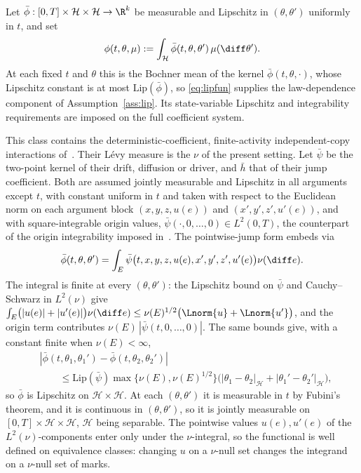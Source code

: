 \begin{example}\label{ex:expfunc}
Let $\bar\phi:[0,T]\times\mathcal H\times\mathcal H\to\R^k$ be measurable and Lipschitz in
$(\theta,\theta')$ uniformly in $t$, and set
\[
\phi(t,\theta,\mu):=\int_{\mathcal H}\bar\phi(t,\theta,\theta')\,\mu(\diff\theta') .
\]
At each fixed $t$ and $\theta$ this is the Bochner mean of the kernel
$\bar\phi(t,\theta,\cdot)$, whose Lipschitz constant is at most $\mathrm{Lip}(\bar\phi)$, so
\eqref{eq:lipfun} supplies the law-dependence component of Assumption~\ref{ass:lip}. Its
state-variable Lipschitz and integrability requirements are imposed on the full coefficient
system.

This class contains the deterministic-coefficient, finite-activity independent-copy
interactions of~\cite{LiMin}. Their L\'evy measure is the $\nu$ of the present setting. Let
$\bar\psi$ be the two-point kernel of their drift, diffusion or driver, and $\bar h$ that of
their jump coefficient. Both are assumed jointly measurable and Lipschitz in all arguments
except $t$, with
constant uniform in $t$ and taken with respect to the Euclidean norm on each argument block
$(x,y,z,u(e))$ and $(x',y',z',u'(e))$, and with square-integrable origin values,
$\bar\psi(\cdot,0,\dots,0)\in L^2(0,T)$, the counterpart of the origin integrability
imposed in~\cite[(H3.1)]{LiMin}.
The pointwise-jump form embeds via
\[
\bar\phi(t,\theta,\theta')=\int_E\bar\psi\bigl(t,x,y,z,u(e),x',y',z',u'(e)\bigr)\nu(\diff e).
\]
The integral is finite at every $(\theta,\theta')$: the Lipschitz bound on $\bar\psi$ and
Cauchy--Schwarz in $L^2(\nu)$ give
$\int_E\bigl(|u(e)|+|u'(e)|\bigr)\nu(\diff e)\le\nu(E)^{1/2}\bigl(\Lnorm{u}+\Lnorm{u'}\bigr)$,
and the origin term contributes $\nu(E)\,|\bar\psi(t,0,\dots,0)|$. The same bounds give,
with a constant finite when $\nu(E)<\infty$,
\[
\begin{aligned}
&|\bar\phi(t,\theta_1,\theta_1')-\bar\phi(t,\theta_2,\theta_2')|\\
&\qquad\le\mathrm{Lip}(\bar\psi)\max\{\nu(E),\nu(E)^{1/2}\}
\bigl(|\theta_1-\theta_2|_{\mathcal H}+|\theta_1'-\theta_2'|_{\mathcal H}\bigr),
\end{aligned}
\]
so $\bar\phi$ is Lipschitz on $\mathcal H\times\mathcal H$. At each $(\theta,\theta')$ it is
measurable in $t$ by Fubini's theorem, and it is continuous in $(\theta,\theta')$, so it is
jointly measurable on $[0,T]\times\mathcal H\times\mathcal H$, $\mathcal H$ being separable.
The pointwise values $u(e),u'(e)$ of the $L^2(\nu)$-components enter only under the $\nu$-integral, so the functional is
well defined on equivalence classes: changing $u$ on a $\nu$-null set changes the
integrand on a $\nu$-null set of marks.


\end{example}
